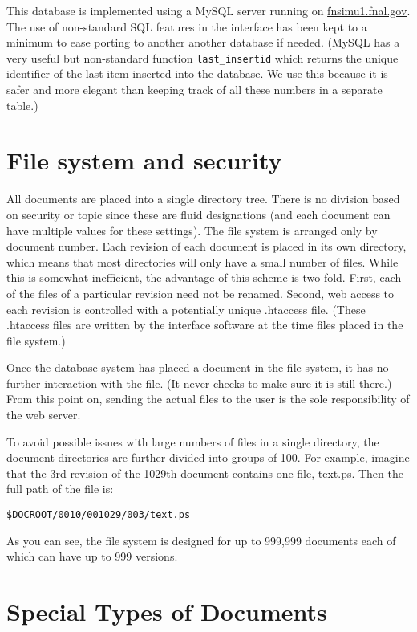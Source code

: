 \documentclass[12pt]{article}
\begin{document}
This database is implemented using a MySQL server running on
\url{fnsimu1.fnal.gov}.  The use of non-standard SQL features in the interface
has been kept to a minimum to ease porting to another another database if needed.
(MySQL has a very useful but non-standard function \texttt{last\_insertid} which
returns the unique identifier of the last item inserted into the database. We use
this because it is safer and more elegant than keeping track of all these numbers
in a separate table.)

\section{File system and security}

All documents are placed into a single directory tree. There is no  division
based on security or topic since these are fluid designations  (and each
document can have multiple values for these settings). The  file system is
arranged only by document number. Each revision of each  document is placed in
its own directory, which means that most  directories will only have a small
number of files. While this is somewhat inefficient, the  advantage of this
scheme is two-fold. First, each of the files of a  particular revision need not
be renamed. Second, web access to each  revision is controlled with a
potentially unique .htaccess file. (These .htaccess files are written by the
interface software at the time files placed in the file system.)

Once the database system has placed a document in the file system, it has no
further interaction with the file. (It never checks to make sure it is still
there.) From this point on, sending the actual files to the user is the sole
responsibility of the web server.

To avoid possible issues with large numbers of files in a single 
directory, the document directories are further divided into groups of 
100. For example, imagine that the 3rd revision of the 1029th document 
contains one file, text.ps. Then the full path of the file is:

\texttt{\$DOCROOT/0010/001029/003/text.ps}

As you can see, the file system is designed for up to 999,999 documents 
each of which can have up to 999 versions.

\section{Special Types of Documents}
\end{document}
